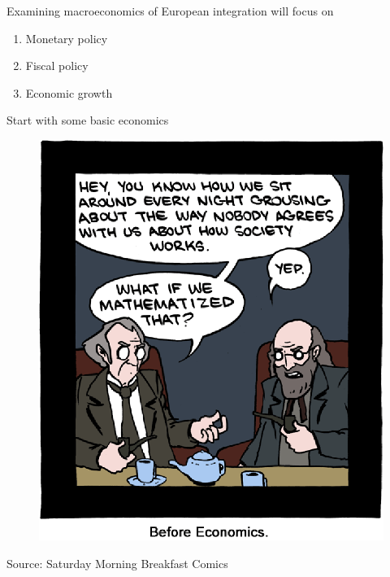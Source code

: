 \documentclass{beamer}
\begin{document}
\begin{frame}
  Examining macroeconomics of European integration will focus on
  \begin{enumerate}
    \item Monetary policy
    \item Fiscal policy
    \item Economic growth
  \end{enumerate}
  \medskip
  Start with some basic economics
\end{frame}

\begin{frame}
  \begin{figure}
    \includegraphics[scale=.6]{smbc.eps}
  \end{figure}
  Source: Saturday Morning Breakfast Comics
\end{frame}
\end{document}
